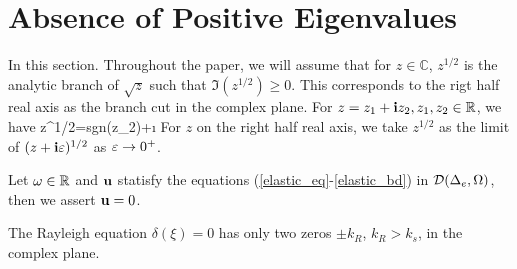 \documentclass[12pt]{iopart}
\begin{document}
\section{Absence of Positive Eigenvalues}
In this section. Throughout the paper, we will assume that for $z\in\mathbb{C}$, $z^{1/2}$ is the analytic branch of $\sqrt{z}$ such that $\Im (z^{1/2})\geq0$. This corresponds to the rigt half real axis as the branch cut in the complex plane. For $z=z_1+\mathbf{i} z_2,z_1,z_2\in\mathbb{R}$, we have
\be \label{convention_1}
z^{1/2}=sgn(z_2)+\i{}
\ee
For $z$ on the right half real axis, we take $z^{1/2}$ as the limit of $(z+\mathbf{i}\varepsilon)^{1/2}$ as $\varepsilon \to 0^+$.
\begin{thm}\label{2.1}
	Let $\omega\in {\mathbb{R}}$ and $\mathbf{u}$ statisfy the equations (\ref{elastic_eq}-\ref{elastic_bd}) in $\mathcal{D}(\Delta_e,\Omega)$,
	then we assert $\mathbf{u}=0$.
\end{thm}
\begin{lem} \label{lem2.1}
	The Rayleigh equation $\delta(\xi) = 0$ has only two zeros $\pm k_R$, $k_R>k_s$, in the complex plane. 
\end{lem}
\end{document}
